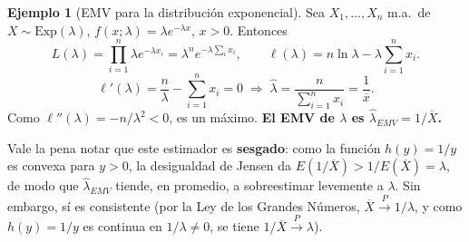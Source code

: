 \documentclass[11pt,a4paper]{article}
\theoremstyle{plain}
\theoremstyle{definition}
\newtheorem{ejemplo}[teorema]{Ejemplo}
\theoremstyle{remark}
\begin{document}
\begin{ejemplo}[EMV para la distribución exponencial]
Sea $X_1,\dots,X_n$ m.a.\ de $X\sim\text{Exp}(\lambda)$, $f(x;\lambda)=\lambda e^{-\lambda x}$, $x>0$. Entonces
\[
L(\lambda) = \prod_{i=1}^n \lambda e^{-\lambda x_i} = \lambda^n e^{-\lambda\sum_i x_i}, \qquad \ell(\lambda) = n\ln\lambda - \lambda\sum_{i=1}^n x_i.
\]
\[
\ell'(\lambda) = \frac{n}{\lambda}-\sum_{i=1}^n x_i = 0 \;\Longrightarrow\; \widehat\lambda = \frac{n}{\sum_{i=1}^n x_i} = \frac{1}{\overline x}.
\]
Como $\ell''(\lambda)=-n/\lambda^2<0$, es un máximo. \textbf{El EMV de $\lambda$ es $\widehat\lambda_{EMV}=1/\overline X$.}

Vale la pena notar que este estimador es \textbf{sesgado}: como la función $h(y)=1/y$ es convexa para $y>0$, la desigualdad de Jensen da $E(1/\overline X) > 1/E(\overline X) = \lambda$, de modo que $\widehat\lambda_{EMV}$ tiende, en promedio, a sobreestimar levemente a $\lambda$. Sin embargo, sí es consistente (por la Ley de los Grandes Números, $\overline X\xrightarrow{P}1/\lambda$, y como $h(y)=1/y$ es continua en $1/\lambda\neq 0$, se tiene $1/\overline X \xrightarrow{P} \lambda$).
\end{ejemplo}
\end{document}
